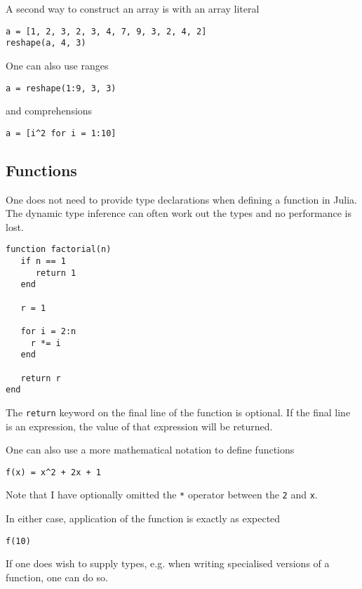 \documentclass[a4paper,10pt]{article}
\newcommand{\code}{\lstinline}
\begin{document}
{A second way to construct an array is with an array literal

\begin{lstlisting}
a = [1, 2, 3, 2, 3, 4, 7, 9, 3, 2, 4, 2]
reshape(a, 4, 3)
\end{lstlisting}

One can also use ranges

\begin{lstlisting}
a = reshape(1:9, 3, 3)
\end{lstlisting}

and comprehensions

\begin{lstlisting}
a = [i^2 for i = 1:10]
\end{lstlisting}

\subsection{Functions}

One does not need to provide type declarations when defining a function in Julia. The dynamic
type inference can often work out the types and no performance is lost.

\begin{lstlisting}
function factorial(n)
   if n == 1
      return 1
   end

   r = 1
   
   for i = 2:n
     r *= i
   end

   return r  
end
\end{lstlisting}

The \code{return} keyword on the final line of the function is optional. If the final line is 
an expression, the value of that expression will be returned.

One can also use a more mathematical notation to define functions

\begin{lstlisting}
f(x) = x^2 + 2x + 1
\end{lstlisting}

Note that I have optionally omitted the \code{*} operator between the \code{2} and \code{x}.

In either case, application of the function is exactly as expected

\begin{lstlisting}
f(10)
\end{lstlisting}

If one does wish to supply types, e.g. when writing specialised versions of a function, one
can do so.

}
\end{document}
